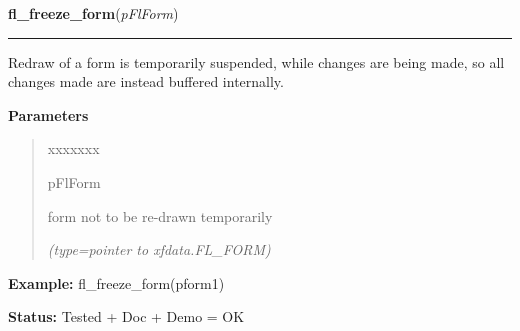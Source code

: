 \hspace{.8\funcindent}\begin{boxedminipage}{\funcwidth}

    \raggedright \textbf{fl\_freeze\_form}(\textit{pFlForm})

    \vspace{-1.5ex}

    \rule{\textwidth}{0.5\fboxrule}
\setlength{\parskip}{2ex}
    Redraw of a form is temporarily suspended, while changes are being 
    made, so all changes made are instead buffered internally.

\setlength{\parskip}{1ex}
      \textbf{Parameters}
      \vspace{-1ex}

      \begin{quote}
        \begin{Ventry}{xxxxxxx}

          \item[pFlForm]

          form not to be re-drawn temporarily

            {\it (type=pointer to xfdata.FL\_FORM)}

        \end{Ventry}

      \end{quote}

\textbf{Example:} fl\_freeze\_form(pform1)



\textbf{Status:} Tested + Doc + Demo = OK



    \end{boxedminipage}

    \label{xformslib:flbasic:fl_set_focus_object}

    \vspace{0.5ex}

